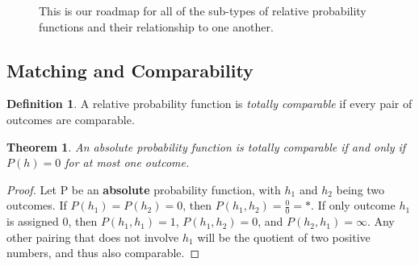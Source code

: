 \documentclass[twoside]{article}
\theoremstyle{plain}%
\newtheorem{theorem}{Theorem}[section]
\theoremstyle{definition}
\newtheorem{definition}{Definition}[section]
\theoremstyle{remark}
\begin{document}
\begin{figure}
\caption{This is our roadmap for all of the sub-types of relative probability functions and their relationship to one another. }
\label{fig:flow_chart}
\end{figure}

\subsection{Matching and Comparability}

\begin{definition}
\label{def:totally_comparable}
A relative probability function is \textit{totally comparable} if every pair of outcomes are comparable.
\end{definition}

\begin{theorem}
\label{thm:abs_totally_comparable}
An absolute probability function is totally comparable if and only if \(P(h) = 0\) for at most one outcome.
\end{theorem}

\begin{proof}
Let P be an \textbf{absolute} probability function, with \(h_1\) and \(h_2\) being two outcomes. If \(P(h_1) = P(h_2) = 0\), then \(P(h_1, h_2) = \frac{0}{0} = \ast\). If only outcome \(h_1\) is assigned 0, then \(P(h_1, h_1) = 1\), \(P(h_1, h_2) = 0\), and \(P(h_2, h_1) = \infty\). Any other pairing that does not involve \(h_1\) will be the quotient of two positive numbers, and thus also comparable.
\end{proof}
\end{document}
